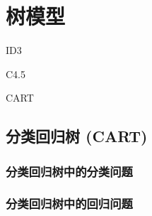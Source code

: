 \chapter{树模型}

\begin{introduction}
    \item ID3
    \item C4.5
    \item CART
\end{introduction}

\section{分类回归树 (CART)}

\subsection{分类回归树中的分类问题}

\subsection{分类回归树中的回归问题}
